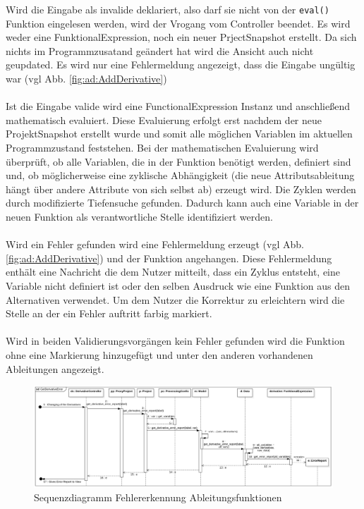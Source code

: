 \documentclass{article}
\begin{document}
Wird die Eingabe als invalide deklariert, also darf sie nicht von der \texttt{eval()} Funktion eingelesen werden, wird der Vrogang vom Controller beendet. Es wird weder eine FunktionalExpression, noch ein neuer PrjectSnapshot erstellt. Da sich nichts im Programmzusatand geändert hat wird die Ansicht auch nicht geupdated. Es wird nur eine Fehlermeldung angezeigt, dass die Eingabe ungültig war (vgl Abb. \ref{fig:ad:AddDerivative})
\\\\
Ist die Eingabe valide wird eine FunctionalExpression Instanz und anschließend mathematisch evaluiert. Diese Evaluierung erfolgt erst nachdem der neue ProjektSnapshot erstellt wurde und somit alle möglichen Variablen im aktuellen Programmzustand feststehen. Bei der mathematischen Evaluierung wird überprüft, ob alle Variablen, die in der Funktion benötigt werden, definiert sind und, ob möglicherweise eine zyklische Abhängigkeit (die neue Attributsableitung hängt über andere Attribute von sich selbst ab) erzeugt wird. Die Zyklen werden durch modifizierte Tiefensuche gefunden. Dadurch kann auch eine Variable in der neuen Funktion als verantwortliche Stelle identifiziert werden.
\\\\Wird ein Fehler gefunden wird eine Fehlermeldung erzeugt (vgl Abb. \ref{fig:ad:AddDerivative}) und der Funktion angehangen. Diese Fehlermeldung enthält eine Nachricht die dem Nutzer mitteilt, dass ein Zyklus entsteht, eine Variable nicht definiert ist oder den selben Ausdruck wie eine Funktion aus den Alternativen verwendet. Um dem Nutzer die Korrektur zu erleichtern wird die Stelle an der ein Fehler auftritt farbig markiert.\\\\
Wird in beiden Validierungsvorgängen kein Fehler gefunden wird die Funktion ohne eine Markierung hinzugefügt und unter den anderen vorhandenen Ableitungen angezeigt.
\\
\begin{figure}[H]%
    \centering
    \includegraphics[width=12cm]{entwurf/Floriane/GetDerivativeError.png}
    \caption{Sequenzdiagramm Fehlererkennung Ableitungsfunktionen}
    \label{fig:sq:GetDerivativeError}
\end{figure}
\end{document}

